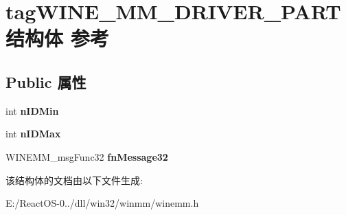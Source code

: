 \hypertarget{structtag_w_i_n_e___m_m___d_r_i_v_e_r___p_a_r_t}{}\section{tag\+W\+I\+N\+E\+\_\+\+M\+M\+\_\+\+D\+R\+I\+V\+E\+R\+\_\+\+P\+A\+R\+T结构体 参考}
\label{structtag_w_i_n_e___m_m___d_r_i_v_e_r___p_a_r_t}
\subsection*{Public 属性}
\begin{DoxyCompactItemize}
\item 
\mbox{\label{structtag_w_i_n_e___m_m___d_r_i_v_e_r___p_a_r_t_aa7e2c9c4c6b151af1ffcf08a78dcce41}} 
int {\bfseries n\+I\+D\+Min}
\item 
\mbox{\label{structtag_w_i_n_e___m_m___d_r_i_v_e_r___p_a_r_t_a795fdf6298e65130d03e75dda442f9a5}} 
int {\bfseries n\+I\+D\+Max}
\item 
\mbox{\label{structtag_w_i_n_e___m_m___d_r_i_v_e_r___p_a_r_t_a495aa7e896f072deceb8ddb3753e29a5}} 
W\+I\+N\+E\+M\+M\+\_\+msg\+Func32 {\bfseries fn\+Message32}
\end{DoxyCompactItemize}


该结构体的文档由以下文件生成\+:\begin{DoxyCompactItemize}
\item 
E\+:/\+React\+O\+S-\/0../dll/win32/winmm/winemm.\+h\end{DoxyCompactItemize}
